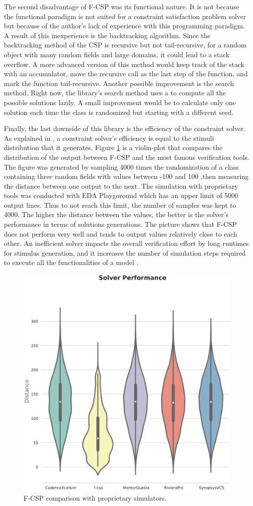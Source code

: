 The second disadvantage of F-CSP was its functional nature. It is not because
the functional paradigm is not suited for a constraint satisfaction problem
solver but because of the author's lack of experience with this programming
paradigm. A result of this inexperience is the backtracking algorithm. Since the
backtracking method of the CSP is recursive but not tail-recursive, for a random
object with many random fields and large domains, it could lead to a stack
overflow. A more advanced version of this method would keep track of the stack
with an accumulator, move the recursive call as the last step of the function,
and mark the function tail-recursive. Another possible improvement is the search
method. Right now, the library's search method uses a  to compute
all the possible solutions lazily. A small improvement would be to calculate
only one solution each time the class is randomized but starting with a
different seed.


Finally, the last downside of this library is the efficiency of the constraint
solver. As explained in \cite{kitchen2007stimulus}, a constraint solver's
efficiency is equal to the stimuli distribution that it generates. Figure
\ref{fig:fcsp:comparison} is a violin-plot that compares the distribution of the
output between F-CSP and the most famous verification tools. The figure was
generated by sampling 4000 times the randomization of a class containing three
random fields with values between -100 and 100 ,then measuring the distance
between one output to the next. The simulation with proprietary tools was
conducted with EDA Playgoround \cite{online:eadaplayground} which has an upper
limit of 5000 output lines. Thus to not reach this limit, the number of samples
was kept to 4000. The higher the distance between the values, the better is the
solver's performance in terms of solutions generations. The picture shows that
F-CSP does not perform very well and tends to output values relatively close to
each other. An inefficient solver impacts the overall verification effort by
long runtimes for stimulus generation, and it increases the number of simulation
steps required to execute all the functionalities of a model
\cite{kitchen2007stimulus}.

\begin{figure}[!ht]
\centering
\includegraphics[width=0.7\linewidth]{pictures/F-CSP_performances.eps}
\caption{F-CSP comparison with proprietary simulators.}
\label{fig:fcsp:comparison}
\end{figure}

